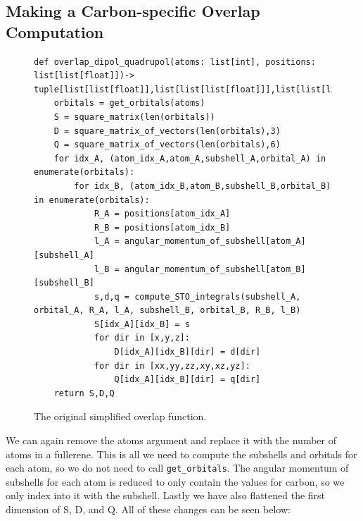 \subsection{Making a Carbon-specific Overlap Computation}

\begin{figure}[H]
\begin{verbatim}
def overlap_dipol_quadrupol(atoms: list[int], positions: list[list[float]])-> tuple[list[list[float]],list[list[list[float]]],list[list[list[float]]]]:
    orbitals = get_orbitals(atoms)
    S = square_matrix(len(orbitals))
    D = square_matrix_of_vectors(len(orbitals),3)
    Q = square_matrix_of_vectors(len(orbitals),6)
    for idx_A, (atom_idx_A,atom_A,subshell_A,orbital_A) in enumerate(orbitals):
        for idx_B, (atom_idx_B,atom_B,subshell_B,orbital_B) in enumerate(orbitals):
            R_A = positions[atom_idx_A]
            R_B = positions[atom_idx_B]
            l_A = angular_momentum_of_subshell[atom_A][subshell_A]
            l_B = angular_momentum_of_subshell[atom_B][subshell_B]
            s,d,q = compute_STO_integrals(subshell_A, orbital_A, R_A, l_A, subshell_B, orbital_B, R_B, l_B)
            S[idx_A][idx_B] = s
            for dir in [x,y,z]:
                D[idx_A][idx_B][dir] = d[dir]
            for dir in [xx,yy,zz,xy,xz,yz]:
                Q[idx_A][idx_B][dir] = q[dir]
    return S,D,Q
\end{verbatim}
\caption{The original simplified overlap function.}
\end{figure}

We can again remove the atoms argument and replace it with the number of atoms in a fullerene. This is all we need to compute the subshells and orbitals for each atom, so we do not need to call \verb|get_orbitals|. The angular momentum of subshells for each atom is reduced to only contain the values for carbon, so we only index into it with the subshell. Lastly we have also flattened the first dimension of S, D, and Q. All of these changes can be seen below:

